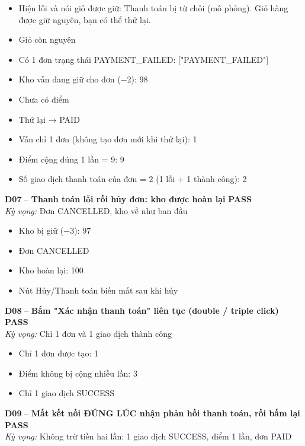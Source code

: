 \documentclass[a4paper,11pt]{article}
\newcommand{\ok}{\textcolor{okgreen}{\textbf{PASS}}}
\begin{document}
\begin{itemize}\footnotesize
\item \tick Hiện lỗi và nói giỏ được giữ: Thanh toán bị từ chối (mô phỏng). Giỏ hàng được giữ nguyên, bạn có thể thử lại.
\item \tick Giỏ còn nguyên
\item \tick Có 1 đơn trạng thái PAYMENT\_FAILED: ["PAYMENT\_FAILED"]
\item \tick Kho vẫn đang giữ cho đơn (−2): 98
\item \tick Chưa có điểm
\item \tick Thử lại → PAID
\item \tick Vẫn chỉ 1 đơn (không tạo đơn mới khi thử lại): 1
\item \tick Điểm cộng đúng 1 lần = 9: 9
\item \tick Số giao dịch thanh toán của đơn = 2 (1 lỗi + 1 thành công): 2
\end{itemize}
\begin{minipage}{\textwidth}\vspace{4pt}\textbf{\textcolor{brew}{D07}} -- \textbf{Thanh toán lỗi rồi hủy đơn: kho được hoàn lại} \hfill \ok\\
{\small\emph{Kỳ vọng:} Đơn CANCELLED, kho về như ban đầu}
\end{minipage}
\begin{itemize}\footnotesize
\item \tick Kho bị giữ (−3): 97
\item \tick Đơn CANCELLED
\item \tick Kho hoàn lại: 100
\item \tick Nút Hủy/Thanh toán biến mất sau khi hủy
\end{itemize}
\begin{minipage}{\textwidth}\vspace{4pt}\textbf{\textcolor{brew}{D08}} -- \textbf{Bấm "Xác nhận thanh toán" liên tục (double / triple click)} \hfill \ok\\
{\small\emph{Kỳ vọng:} Chỉ 1 đơn và 1 giao dịch thành công}
\end{minipage}
\begin{itemize}\footnotesize
\item \tick Chỉ 1 đơn được tạo: 1
\item \tick Điểm không bị cộng nhiều lần: 3
\item \tick Chỉ 1 giao dịch SUCCESS
\end{itemize}
\begin{minipage}{\textwidth}\vspace{4pt}\textbf{\textcolor{brew}{D09}} -- \textbf{Mất kết nối ĐÚNG LÚC nhận phản hồi thanh toán, rồi bấm lại} \hfill \ok\\
{\small\emph{Kỳ vọng:} Không trừ tiền hai lần: 1 giao dịch SUCCESS, điểm 1 lần, đơn PAID}
\end{minipage}
\end{document}
